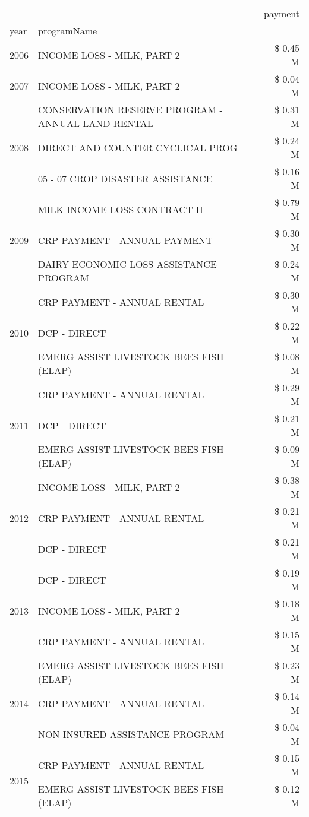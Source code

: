 \begin{tabular}{llr}
\toprule
 &  & payment \\
year & programName &  \\
\midrule
2006 & INCOME LOSS - MILK, PART 2 & \$ 0.45 M \\
\cline{1-3}
2007 & INCOME LOSS - MILK, PART 2 & \$ 0.04 M \\
\cline{1-3}
\multirow[t]{3}{*}{2008} & CONSERVATION RESERVE PROGRAM - ANNUAL LAND RENTAL & \$ 0.31 M \\
 & DIRECT AND COUNTER CYCLICAL PROG & \$ 0.24 M \\
 & 05 - 07 CROP DISASTER ASSISTANCE & \$ 0.16 M \\
\cline{1-3}
\multirow[t]{3}{*}{2009} & MILK INCOME LOSS CONTRACT II & \$ 0.79 M \\
 & CRP PAYMENT - ANNUAL PAYMENT & \$ 0.30 M \\
 & DAIRY ECONOMIC LOSS ASSISTANCE PROGRAM & \$ 0.24 M \\
\cline{1-3}
\multirow[t]{3}{*}{2010} & CRP PAYMENT - ANNUAL RENTAL & \$ 0.30 M \\
 & DCP - DIRECT & \$ 0.22 M \\
 & EMERG ASSIST LIVESTOCK BEES FISH (ELAP) & \$ 0.08 M \\
\cline{1-3}
\multirow[t]{3}{*}{2011} & CRP PAYMENT - ANNUAL RENTAL & \$ 0.29 M \\
 & DCP - DIRECT & \$ 0.21 M \\
 & EMERG ASSIST LIVESTOCK BEES FISH (ELAP) & \$ 0.09 M \\
\cline{1-3}
\multirow[t]{3}{*}{2012} & INCOME LOSS - MILK, PART 2 & \$ 0.38 M \\
 & CRP PAYMENT - ANNUAL RENTAL & \$ 0.21 M \\
 & DCP - DIRECT & \$ 0.21 M \\
\cline{1-3}
\multirow[t]{3}{*}{2013} & DCP - DIRECT & \$ 0.19 M \\
 & INCOME LOSS - MILK, PART 2 & \$ 0.18 M \\
 & CRP PAYMENT - ANNUAL RENTAL & \$ 0.15 M \\
\cline{1-3}
\multirow[t]{3}{*}{2014} & EMERG ASSIST LIVESTOCK BEES FISH (ELAP) & \$ 0.23 M \\
 & CRP PAYMENT - ANNUAL RENTAL & \$ 0.14 M \\
 & NON-INSURED ASSISTANCE PROGRAM & \$ 0.04 M \\
\cline{1-3}
\multirow[t]{3}{*}{2015} & CRP PAYMENT - ANNUAL RENTAL & \$ 0.15 M \\
 & EMERG ASSIST LIVESTOCK BEES FISH (ELAP) & \$ 0.12 M \\

\end{tabular}
